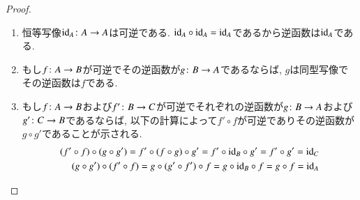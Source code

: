\begin{proof}


\begin{enumerate}
\item 恒等写像$\id_A\taking A\to A$は可逆である. $\id_A\circ\id_A=\id_A$であるから逆函数は$\id_A$である.
\item もし$f\colon A\rightarrow B$が可逆でその逆函数が$g\colon B\rightarrow A$であるならば, $g$は同型写像でその逆函数は$f$である.
\item もし$f\colon A\rightarrow B$および$f'\colon B\rightarrow C$が可逆でそれぞれの逆函数が$g\colon B\rightarrow A$および$g'\colon C\rightarrow B$であるならば, 以下の計算によって$f'\circ f$が可逆でありその逆函数が$g\circ g'$であることが示される.
\begin{align*}
(f'\circ f)\circ(g\circ g')=f'\circ(f\circ g)\circ g'=f'\circ\id_B\circ g'=f'\circ g'=\id_C\\
(g\circ g')\circ(f'\circ f)=g\circ(g'\circ f')\circ f=g\circ\id_B\circ f=g\circ f=\id_A
\end{align*}
\end{enumerate}

\end{proof}

